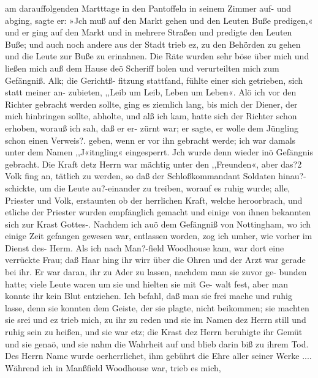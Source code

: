 am darauffolgenden Martttage in den Pantoffeln in seinem
Zimmer auf- und abging, sagte er: »Jch muß auf den Markt
gehen und den Leuten Buße predigen,« und er ging auf den Markt
und in mehrere Straßen und predigte den Leuten Buße; und auch
noch andere aus der Stadt trieb ez, zu den Behörden zu gehen
und die Leute zur Buße zu erinahnen. Die Räte wurden sehr
böse über mich und ließen mich auß dem Hause deö Scheriff
holen und verurteilten mich zum Gefängniß. Alk; die Gerichtß-
fitzung stattfand, fühlte einer sich getrieben, sich statt meiner an-
zubieten, ,,Leib um Leib, Leben um Leben«. Alö ich vor den
Richter gebracht werden sollte, ging es ziemlich lang, bis mich
der Diener, der mich hinbringen sollte, abholte, und alß ich kam,
hatte sich der Richter schon erhoben, worauß ich sah, daß er er-
zürnt war; er sagte, er wolle dem Jüngling schon einen Verweis?.
geben, wenn er vor ihn gebracht werde; ich war damals unter
dem Namen ,,J«itngling« eingesperrt. Jch wurde denn wieder
inö Gefängnis gebracht. Die Kraft detz Herrn war mächtig
unter den ,,Freunden«, aber das?2 Volk fing an, tätlich zu
werden, so daß der Schloßkommandant Soldaten hinau?-schickte,
um die Leute au?-einander zu treiben, worauf es ruhig wurde;
alle, Priester und Volk, erstaunten ob der herrlichen Kraft, welche
heroorbrach, und etliche der Priester wurden empfänglich gemacht
und einige von ihnen bekannten sich zur Krast Gottes-.
Nachdem ich auö dem Gefängniß von Nottingham, wo ich
einige Zeit gefangen gewesen war, entlassen worden, zog ich
umher, wie vorher im Dienst des- Herm. Als ich nach Man?-field
Woodhouse kam, war dort eine verrückte Frau; daß Haar hing
ihr wirr über die Ohren und der Arzt war gerade bei ihr. Er
war daran, ihr zu Ader zu lassen, nachdem man sie zuvor ge-
bunden hatte; viele Leute waren um sie und hielten sie mit Ge-
walt fest, aber man konnte ihr kein Blut entziehen. Ich befahl,
daß man sie frei mache und ruhig lasse, denn sie konnten dem
Geiste, der sie plagte, nicht beikommen; sie machten sie srei und
ez trieb mich, zu ihr zu reden und sie im Namen dez Herrn still
und ruhig sein zu heißen, und sie war etz; die Krast dez Herrn
beruhigte ihr Gemüt und sie genaö, und sie nahm die Wahrheit
auf und blieb darin biß zu ihrem Tod. Des Herrn Name wurde
oerherrlichet, ihm gebührt die Ehre aller seiner Werke ....
Während ich in Manßfield Woodhouse war, trieb es mich,


